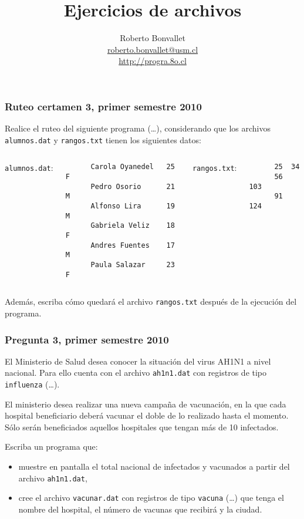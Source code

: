 \documentclass[12pt]{beamer}
\title{Ejercicios de archivos}
\author{
  Roberto Bonvallet \\
  \url{roberto.bonvallet@usm.cl} \\
  \url{http://progra.8o.cl}
}
\begin{document}
  \begin{frame}
    \maketitle
  \end{frame}

  \begin{frame}[fragile]
    \frametitle{Ruteo certamen 3, primer semestre 2010}
    Realice el ruteo del siguiente programa (\ldots),
    considerando que los archivos
    \texttt{alumnos.dat} y \texttt{rangos.txt}
    tienen los siguientes datos:
    \vspace{2ex}

    \begin{columns}[t]
      \texttt{alumnos.dat}:
      \begin{Verbatim}
      Carola Oyanedel   25  F
      Pedro Osorio      21  M
      Alfonso Lira      19  M
      Gabriela Veliz    18  F
      Andres Fuentes    17  M
      Paula Salazar     23  F
      \end{Verbatim}
      \texttt{rangos.txt}:
      \begin{Verbatim}
      25  34
      56  103
      91  124
      \end{Verbatim}
    \end{columns}
    \vspace{2ex}

    Además, escriba cómo quedará el archivo \texttt{rangos.txt}
    después de la ejecución del programa.

\end{frame}

  \begin{frame}
    \frametitle{Pregunta 3, primer semestre 2010}
    El Ministerio de Salud desea conocer la situación
    del virus AH1N1 a nivel nacional.
    Para ello cuenta con el archivo \texttt{ah1n1.dat}
    con registros de tipo \texttt{influenza} (\ldots).

    El ministerio desea realizar una nueva campaña de vacunación,
    en la que cada hospital beneficiario
    deberá vacunar el doble de lo realizado hasta el momento.
    Sólo serán beneficiados aquellos hospitales
    que tengan más de 10 infectados.

    Escriba un programa que:
    \begin{itemize}
      \item muestre en pantalla el total nacional de infectados
        y vacunados a partir del archivo \texttt{ah1n1.dat},
      \item cree el archivo \texttt{vacunar.dat}
        con registros de tipo \texttt{vacuna} (\ldots)
        que tenga el nombre del hospital,
        el número de vacunas que recibirá
        y la ciudad.
    \end{itemize}

  \end{frame}
\end{document}
